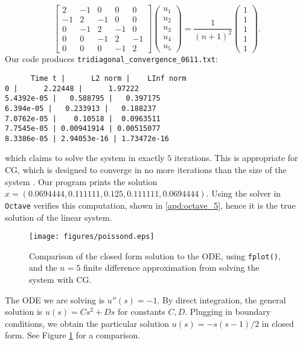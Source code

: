 \documentclass{article}
\begin{document}
\begin{equation*}
	\begin{bmatrix}
		2 & -1 & 0 & 0 & 0 \\
		-1 & 2 & -1 & 0 & 0 \\
		0 & -1 & 2 & -1 & 0 \\
		0 & 0 & -1 & 2 & -1 \\
		0 & 0 & 0 & -1 & 2
	\end{bmatrix} \begin{pmatrix}
	u_1 \\
	u_2 \\
	u_3 \\
	u_4 \\
	u_5
\end{pmatrix} = \frac{1}{(n+1)^2}\begin{pmatrix}
	1 \\
	1 \\
	1 \\
	1 \\
	1
\end{pmatrix}.
\end{equation*}
Our code produces \texttt{tridiagonal\_convergence\_0611.txt}:
\begin{verbatim}
      Time t |      L2 norm |    LInf norm
0 |      2.22448 |      1.97222
5.4392e-05 |   0.588795 |   0.397175
6.394e-05 |   0.233913 |   0.188237
7.0762e-05 |    0.10518 |  0.0963511
7.7545e-05 | 0.00941914 | 0.00515077
8.3386e-05 | 2.94053e-16 | 1.73472e-16
\end{verbatim}
which claims to solve the system in exactly $5$ iterations.
This is appropriate for CG, which is designed to converge in no more iterations than the size of the system \cite{shewchuk1994introduction}.
Our program prints the solution $x = \mathtt{( 0.0694444,   0.111111,      0.125,   0.111111, 0.0694444)}$.
Using the solver in \texttt{Octave} verifies this computation, shown in \ref{apd:octave_5}, hence it is the true solution of the linear system.

\begin{figure}
	\centering
	\texttt{[image: figures/poissond.eps]}
	\caption{
		Comparison of the closed form solution to the ODE, using \texttt{fplot()},
		and the $n=5$ finite difference approximation from solving the system with CG.
}
	\label{fig:poisson1d}
\end{figure}
The ODE we are solving is $u''(s) = -1$.
By direct integration, the general solution is $u(s) = Cs^2 + Ds$ for constants $C, D$.
Plugging in boundary conditions, we obtain the particular solution $u(s) = -s(s-1)/2$ in closed form.
See Figure \ref{fig:poisson1d} for a comparison.
\end{document}
